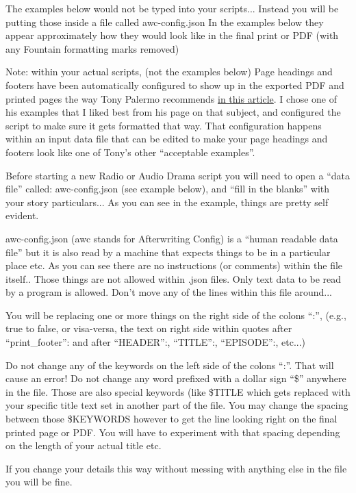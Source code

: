 \documentclass[openleft,oneside,showtrims]{memoir}
\begin{document}
The examples below would not be typed into your scripts... Instead you will be putting those inside a file called awc-config.json  In the examples below they appear approximately how they would look like in the final print or PDF (with any Fountain formatting marks removed)

Note: within your actual scripts, (not the examples below) Page headings and footers have been automatically configured to show up in the exported PDF and printed pages the way Tony Palermo recommends \href{https://www.ruyasonic.com/wrt\_cues.htm\#CUES}{in this article}.  I chose one of his examples that I liked best from his page on that subject, and configured the script to make sure it gets formatted that way. That configuration happens within an input data file that can be edited to make your page headings and footers look like one of Tony's other ``acceptable examples''.

Before starting a new Radio or Audio Drama script you will need to open a ``data file'' called: awc-config.json (see example below), and ``fill in the blanks'' with your story particulars... As you can see in the example, things are pretty self evident.  

awc-config.json (awc stands for Afterwriting Config) is a ``human readable data file'' but it is also read by a machine that expects things to be in a particular place etc. As you can see there are no instructions (or comments) within the file itself.. Those things are not allowed within .json files. Only text data to be read by a program is allowed.  Don't move any of the lines within this file around... 

You will be replacing one or more things on the right side of the colons ``:'', (e.g., true to false, or visa-versa, the text on right side within quotes after ``print\_footer'': and after ``HEADER'':, ``TITLE'':, ``EPISODE'':, etc...)

Do not change any of the keywords on the left side of the colons ``:''.  That will cause an error! Do not change any word prefixed with a dollar sign ``\$'' anywhere in the file.  Those are also special keywords (like \$TITLE which gets replaced with your specific title text set in another part of the file. You may change the spacing between those \$KEYWORDS however to get the line looking right on the final printed page or PDF. You will have to experiment with that spacing depending on the length of your actual title etc.

If you change your details this way without messing with anything else in the file you will be fine. 
\end{document}
